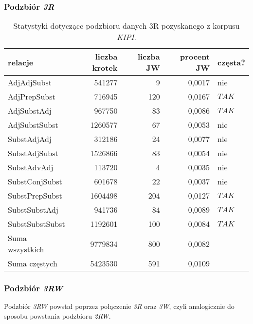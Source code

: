 \subsubsection{Podzbiór \protect\textit{3R}}
\begin{table}[h!]
\centering
\begin{tabular}{ l | r | r | r | l }
	\toprule
	\textbf{relacje} 	& \textbf{liczba krotek} & \textbf{liczba JW} & \textbf{procent JW} & \textbf{częsta?} 	\\
	\midrule
	AdjAdjSubst	&	541277	&	9	&	0,0017	&	nie	\\
	AdjPrepSubst	&	716945	&	120	&	0,0167	&	$ TAK $	\\
	AdjSubstAdj	&	967750	&	83	&	0,0086	&	$ TAK $	\\
	AdjSubstSubst	&	1260577	&	67	&	0,0053	&	nie	\\
	SubstAdjAdj	&	312186	&	24	&	0,0077	&	nie	\\
	SubstAdjSubst	&	1526866	&	83	&	0,0054	&	nie	\\
	SubstAdvAdj	&	113720	&	4	&	0,0035	&	nie	\\
	SubstConjSubst	&	601678	&	22	&	0,0037	&	nie	\\
	SubstPrepSubst	&	1604498	&	204	&	0,0127	&	$ TAK $	\\
	SubstSubstAdj	&	941736	&	84	&	0,0089	&	$ TAK $	\\
	SubstSubstSubst	&	1192601	&	100	&	0,0084	&	$ TAK $	\\
	\midrule									
	Suma wszystkich	&	9779834	&	800	&	0,0082	&		\\
	Suma częstych	&	5423530	&	591	&	0,0109	&		\\
	\bottomrule
\end{tabular}
\caption[Statystyki podzbioru danych \emph{KIPI} 3R]{Statystyki dotyczące podzbioru danych 3R pozyskanego z korpusu \emph{KIPI}.}
\label{KIPI_3R_stats}
\end{table}


\subsubsection{Podzbiór \protect\textit{3RW}}
Podzbiór \emph{3RW} powstał poprzez połączenie \emph{3R} oraz \emph{3W}, czyli analogicznie do sposobu powstania podzbioru \emph{2RW}.


